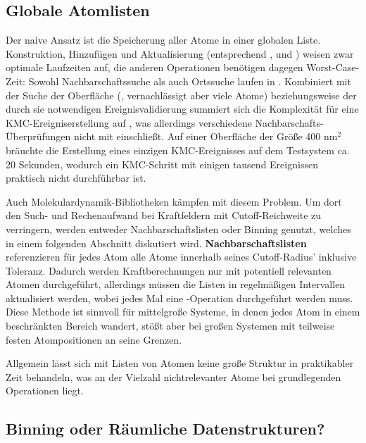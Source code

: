 \subsection{Globale Atomlisten}

Der naive Ansatz ist die Speicherung aller Atome in einer globalen Liste.
Konstruktion, Hinzufügen und Aktualisierung (entsprechend ,  und ) weisen zwar optimale Laufzeiten auf, die anderen Operationen benötigen dagegen Worst-Case-Zeit:
Sowohl Nachbarschaftssuche als auch Ortssuche laufen in . 
Kombiniert mit der Suche der Oberfläche (, vernachlässigt aber viele Atome) beziehungsweise der durch sie notwendigen Ereignisvalidierung summiert sich die Komplexität für eine KMC-Ereigniserstellung auf , was allerdings verschiedene Nachbarschafts-Überprüfungen nicht mit einschließt.
Auf einer Oberfläche der Größe 400 nm$^2$ bräuchte die Erstellung eines einzigen KMC-Ereignisses auf dem Testsystem ca. 20 Sekunden, wodurch ein KMC-Schritt mit einigen tausend Ereignissen praktisch nicht durchführbar ist.

Auch Molekulardynamik-Bibliotheken kämpfen mit diesem Problem.
Um dort den Such- und Rechenaufwand bei Kraftfeldern mit Cutoff-Reichweite zu verringern, werden entweder Nachbarschaftslisten oder Binning genutzt, welches in einem folgenden Abschnitt diskutiert wird.
\textbf{Nachbarschaftslisten} referenzieren für jedes Atom alle Atome innerhalb seines Cutoff-Radius' inklusive Toleranz.
Dadurch werden Kraftberechnungen nur mit potentiell relevanten Atomen durchgeführt, allerdings müssen die Listen in regelmäßigen Intervallen aktualisiert werden, wobei jedes Mal eine -Operation durchgeführt werden muss.
Diese Methode ist sinnvoll für mittelgroße Systeme, in denen jedes Atom in einem beschränkten Bereich wandert, stößt aber bei großen Systemen mit teilweise festen Atompositionen an seine Grenzen.

Allgemein lässt sich mit Listen von Atomen keine große Struktur in praktikabler Zeit behandeln, was an der Vielzahl nichtrelevanter Atome bei grundlegenden Operationen liegt.

\subsection{Binning oder Räumliche Datenstrukturen?}


